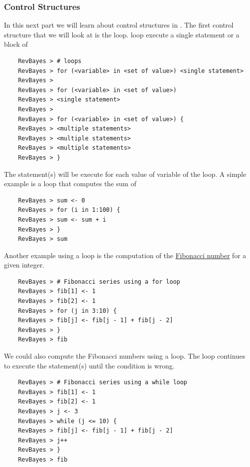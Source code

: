 \subsubsection*{Control Structures}
In this next part we will learn about control structures in \Rev. 
The first control structure that we will look at is the  loop.
 loop execute a single statement or a block of 
{\tt \begin{snugshade*}
\begin{lstlisting}    
    RevBayes > # loops
    RevBayes > for (<variable> in <set of value>) <single statement>
    RevBayes > 
    RevBayes > for (<variable> in <set of value>) 
    RevBayes > <single statement>
    RevBayes >
    RevBayes > for (<variable> in <set of value>) {
    RevBayes > <multiple statements>
    RevBayes > <multiple statements>
    RevBayes > <multiple statements>
    RevBayes > }
\end{lstlisting}
\end{snugshade*}}
The statement(s) will be execute for each value of variable of the  loop.
A simple example is a  loop that computes the sum of 
{\tt \begin{snugshade*}
\begin{lstlisting}    
    RevBayes > sum <- 0
    RevBayes > for (i in 1:100) {
    RevBayes > sum <- sum + i
    RevBayes > }
    RevBayes > sum
\end{lstlisting}
\end{snugshade*}}
Another example using a  loop is the computation of the \href{http://en.wikipedia.org/wiki/Fibonacci_number}{Fibonacci number} for a given integer. 
{\tt \begin{snugshade*}
\begin{lstlisting}    
    RevBayes > # Fibonacci series using a for loop
    RevBayes > fib[1] <- 1
    RevBayes > fib[2] <- 1
    RevBayes > for (j in 3:10) {
    RevBayes > fib[j] <- fib[j - 1] + fib[j - 2]
    RevBayes > }
    RevBayes > fib
\end{lstlisting}
\end{snugshade*}}
We could also compute the Fibonacci numbers using a  loop.
The  loop continues to execute the statement(s) until the condition is wrong.
{\tt \begin{snugshade*}
\begin{lstlisting}    
    RevBayes > # Fibonacci series using a while loop
    RevBayes > fib[1] <- 1
    RevBayes > fib[2] <- 1
    RevBayes > j <- 3
    RevBayes > while (j <= 10) {
    RevBayes > fib[j] <- fib[j - 1] + fib[j - 2]
    RevBayes > j++
    RevBayes > }
    RevBayes > fib
\end{lstlisting}
\end{snugshade*}}

